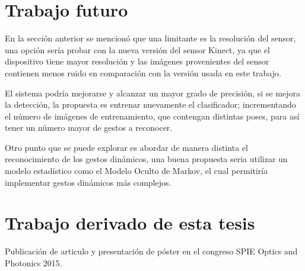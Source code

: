 

\section{Trabajo futuro}\label{futureWork}  

En la sección anterior se mencion\'o que una limitante es la resolución del sensor, una opción ser\'ia probar con la nueva versión del sensor Kinect, ya que el dispositivo tiene mayor resolución y las imágenes provenientes del sensor contienen menos ruido en comparación con la versión usada en este trabajo. 

El sistema podría mejorarse y alcanzar un mayor grado de precisión, si se mejora la detección, la propuesta es entrenar nuevamente el clasificador; incrementando el número de imágenes de entrenamiento, que contengan distintas poses, para así tener un número mayor de gestos a reconocer.

Otro punto que se puede explorar es abordar de manera distinta el reconocimiento de los gestos dinámicos, una buena propuesta seria utilizar un modelo estadístico como el Modelo Oculto de Markov, el cual permitiría implementar gestos dinámicos más complejos.  


\section{Trabajo derivado de esta tesis} 

Publicación de articulo y presentación de póster en el congreso SPIE Optics and Photonics 2015.  

\newpage
